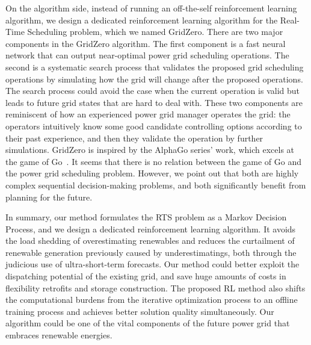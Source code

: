 On the algorithm side, 
instead of running an off-the-self reinforcement learning algorithm, we design a dedicated reinforcement learning algorithm for the Real-Time Scheduling problem, which we named GridZero. There are two major components in the GridZero algorithm. The first component is a fast neural network that can output near-optimal power grid scheduling operations. The second is a systematic search process that validates the proposed grid scheduling operations by simulating how the grid will change after the proposed operations. The search process could avoid the case when the current operation is valid but leads to future grid states that are hard to deal with. These two components are reminiscent of how an experienced power grid manager operates the grid: the operators intuitively know some good candidate controlling options according to their past experience, and then they validate the operation by further simulations. GridZero is inspired by the AlphaGo series' work, which excels at the game of Go~\cite{silver2016mastering,li2018alphago,silver2017mastering,schrittwieser2020mastering}. It seems that there is no relation between the game of Go and the power grid scheduling problem. However, we point out that both are highly complex sequential decision-making problems, and both significantly benefit from planning for the future. 

In summary, our method formulates the RTS problem as a Markov Decision Process, and we design a dedicated reinforcement learning algorithm. It avoids the load shedding of overestimating renewables and reduces the curtailment of renewable generation previously caused by underestimatings, both through the judicious use of ultra-short-term forecasts. Our method could better exploit the dispatching potential of the existing grid, and save huge amounts of costs in flexibility retrofits and storage construction. The proposed RL method also shifts the computational burdens from the iterative optimization process to an offline training process and achieves better solution quality simultaneously. Our algorithm could be one of the vital components of the future power grid that embraces renewable energies. 







